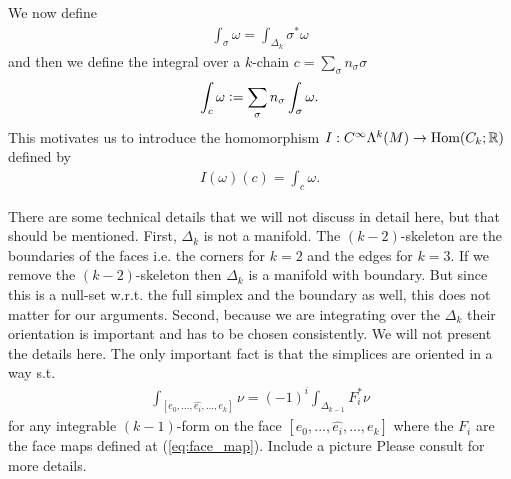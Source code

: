 \documentclass[../master_thesis.tex]{subfiles}
\begin{document}
We now define 
\begin{align*}
    \int_\sigma \omega = \int_{\Delta_k} \sigma^* \omega
\end{align*}
and then we define the integral over a $k$-chain 
$c = \sum_\sigma n_\sigma \sigma$
\begin{align*}
    \int_c \omega \vcentcolon= \sum \limits_\sigma n_\sigma \int_\sigma \omega.
\end{align*}
This motivates us to introduce the homomorphism $I: C^\infty \Lambda^k (M) 
\rightarrow \text{Hom}(C_k;\mathbb{R})$ defined by 
\begin{align*}
    I(\omega)(c) = \int_c \omega.
\end{align*}
\begin{remark}
    There are some technical details that we will not discuss in detail here,
    but that should be mentioned. First, $\Delta_k$ is not a manifold. 
    The $(k-2)$-skeleton are the boundaries of the faces i.e. the corners for $k=2$ and the 
    edges for $k=3$. If we remove the $(k-2)$-skeleton 
    then $\Delta_k$ is a manifold 
    with boundary. But since this is a null-set w.r.t. the full simplex and 
    the boundary as well, this does not matter for our arguments. 
    Second, because we are integrating over the $\Delta_k$ their orientation is 
    important and has to be chosen consistently. We will not present the details here. The 
    only important fact is that the simplices are oriented in a way s.t.
    \begin{align}
        \int_{[e_0,...,\widehat{e_i}, ..., e_k]} \nu = (-1)^i \int_{\Delta_{k-1}} F_i^* \nu 
        \label{eq:integral_boundary_face}
    \end{align}
    for any integrable $(k-1)$-form on the face $[e_0,...,\widehat{e_i}, ..., e_k]$
    where the $F_i$ are the face maps defined at (\ref{eq:face_map}).
    {\color{red} Include a picture} Please consult \cite[Sec. V.5]{arnold} for more 
    details.
\end{remark}
\end{document}
